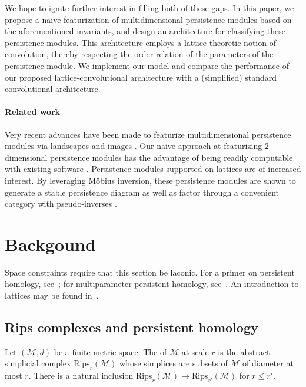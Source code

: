 \documentclass{article}
\begin{document}
We hope to ignite further interest in filling both of these gaps. In this paper, we
propose a naive featurization of multidimensional persistence modules based on
the aforementioned invariants, and design an architecture for classifying these
persistence modules. This architecture employs a lattice-theoretic notion of
convolution, thereby respecting the order relation of the parameters of the
persistence module. We implement our model and compare the performance of our
proposed lattice-convolutional architecture with a (simplified) standard
convolutional architecture.

\paragraph{Related work}
Very recent advances have been made to featurize multidimensional persistence modules via
landscapes \cite{vipond2020multiparameter} and images \cite{carriere2020multiparameter}.
Our naive approach at featurizing $2$-dimensional persistence modules has the advantage
of being readily computable with existing software \cite{lesnick_interactive_2015}.
Persistence modules supported on lattices are of increased interest.
By leveraging M\"{o}bius inversion, these persistence modules are shown to generate a stable persistence diagram \cite{mccleary2020edit} as well as factor through a convenient category with pseudo-inverses \cite{krishnan2020invertibility}.


\section{Backgound}

Space constraints require that this section be laconic. For a primer on
persistent homology, see~\cite{ghrist_barcodes:_2008, carlsson_topology_2009};
for multiparameter persistent homology, see~\cite{lesnick_interactive_2015}. An
introduction to lattices may be found in~\cite{davey2002introduction}.

\subsection{Rips complexes and persistent homology}
Let $(\mathcal M,d)$ be a finite metric space. The  of $\mathcal M$ at scale $r$ is the abstract simplicial complex
$\text{Rips}_r(\mathcal M)$ whose simplices are subsets of $\mathcal M$ of
diameter at most $r$. There is a natural inclusion $\text{Rips}_r(\mathcal M)
\to \text{Rips}_{r'}(\mathcal M)$ for $r \leq r'$.
\end{document}
